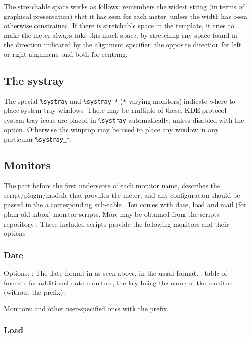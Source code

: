 The stretchable space works as follows:  remembers
the widest string (in terms of graphical presentation) that it has
seen for each meter, unless the width has been otherwise constrained.
If there is stretchable space in the template, it tries to make the
meter always take this much space, by stretching any space found in
the direction indicated by the alignment specifier: the opposite
direction for left or right alignment, and both for centring.

\subsection{The systray}

The special \verb!%systray! and \verb!%systray_*! (\verb!*! varying
monitors) indicate where to place system tray windows. 
There may be multiple of these. KDE-protocol system tray
icons are placed in \verb!%systray! automatically, unless disabled with
the  option. Otherwise the  winprop may
be used to place any window in any particular \verb!%systray_*!.

\subsection{Monitors}

The part before the first
underscore of each monitor name, describes the script/plugin/module
that provides the meter, and any configuration should be passed
in the a corresponding sub-table .
Ion comes with date, load and mail (for plain old mbox) 
 monitor scripts. More may be obtained from 
the scripts repository \cite{scripts}. These included scripts 
provide the following monitors and their options

\subsubsection{Date}

Options: : The date format in as seen above, 
in the usual  format. : table of
formats for additional date monitors, the key being the name
of the monitor (without the  prefix).

Monitors:  and other user-specified ones with the
 prefix.


\subsubsection{Load}

